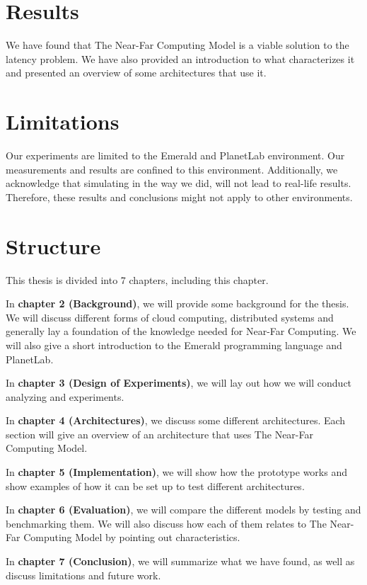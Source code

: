 \section{Results}
We have found that The Near-Far Computing Model is a viable solution to the latency problem. We have also provided an introduction to what characterizes it and presented an overview of some architectures that use it.

\section{Limitations}
Our experiments are limited to the Emerald and PlanetLab environment. Our measurements and results are confined to this environment. Additionally, we acknowledge that simulating in the way we did, will not lead to real-life results. Therefore, these results and conclusions might not apply to other environments.



\section{Structure}
This thesis is divided into 7 chapters, including this chapter.

In \textbf{chapter 2 (Background)}, we will provide some background for the thesis. We will discuss different forms of cloud computing, distributed systems and generally lay a foundation of the knowledge needed for Near-Far Computing. We will also give a short introduction to the Emerald programming language and PlanetLab.

In \textbf{chapter 3 (Design of Experiments)}, we will lay out how we will conduct analyzing and experiments.

In \textbf{chapter 4 (Architectures)}, we discuss some different architectures. Each section will give an overview of an architecture that uses The Near-Far Computing Model.

In \textbf{chapter 5 (Implementation)}, we will show how the prototype works and show examples of how it can be set up to test different architectures.

In \textbf{chapter 6 (Evaluation)}, we will compare the different models by testing and benchmarking them. We will also discuss how each of them relates to The Near-Far Computing Model by pointing out characteristics.

In \textbf{chapter 7 (Conclusion)}, we will summarize what we have found, as well as discuss limitations and future work.

